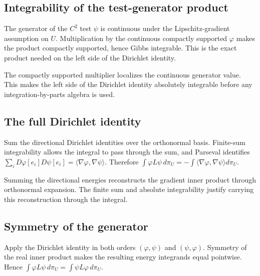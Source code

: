 \documentclass[11pt,a4paper]{report}
\begin{document}
\subsection{\texorpdfstring{Integrability of the test-generator product}{Integrability of the test-generator product}}
\label{report-step-UnadjustedLangevin-GeneratorDirichlet-lean-5}


The generator of the \(C^2\) test \(\psi\) is continuous under the Lipschitz-gradient assumption on \(U\). Multiplication by the continuous compactly supported \(\varphi\) makes the product compactly supported, hence Gibbs integrable. This is the exact product needed on the left side of the Dirichlet identity.



The compactly supported multiplier localizes the continuous generator value. This makes the left side of the Dirichlet identity absolutely integrable before any integration-by-parts algebra is used.

\subsection{\texorpdfstring{The full Dirichlet identity}{The full Dirichlet identity}}
\label{report-step-UnadjustedLangevin-GeneratorDirichlet-lean-6}


Sum the directional Dirichlet identities over the orthonormal basis. Finite-sum integrability allows the integral to pass through the sum, and Parseval identifies \(\sum_iD\varphi[e_i]D\psi[e_i]=\langle\nabla\varphi,\nabla\psi\rangle\). Therefore \(\int\varphi L\psi\,d\pi_U=-\int\langle\nabla\varphi,\nabla\psi\rangle d\pi_U\).



Summing the directional energies reconstructs the gradient inner product through orthonormal expansion. The finite sum and absolute integrability justify carrying this reconstruction through the integral.

\subsection{\texorpdfstring{Symmetry of the generator}{Symmetry of the generator}}
\label{report-step-UnadjustedLangevin-GeneratorDirichlet-lean-7}


Apply the Dirichlet identity in both orders \((\varphi,\psi)\) and \((\psi,\varphi)\). Symmetry of the real inner product makes the resulting energy integrands equal pointwise. Hence \(\int\varphi L\psi\,d\pi_U=\int\psi L\varphi\,d\pi_U\).
\end{document}
